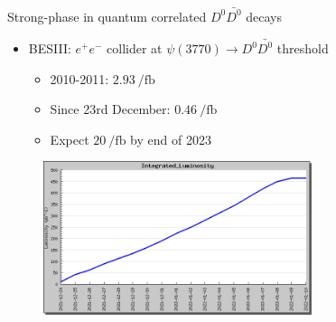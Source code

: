 \documentclass{beamer}
\begin{document}
\begin{frame}{Strong-phase in quantum correlated $D^0\bar{D^0}$ decays}
  \begin{itemize}
    \item{BESIII: $e^+e^-$ collider at $\psi(3770)\to D^0\bar{D^0}$ threshold}
    \begin{itemize}
      \item{2010-2011: $\SI{2.93}{\per\femto\barn}$}
      \item{Since 23rd December: $\SI{0.46}{\per\femto\barn}$}
      \item{Expect $\SI{20}{\per\femto\barn}$ by end of 2023}
    \end{itemize}
  \end{itemize}
  \begin{figure}
    \includegraphics[width = 0.70\textwidth]{Plots/BES3_Integrated_Luminosity.png}
  \end{figure}
\end{frame}
\end{document}

